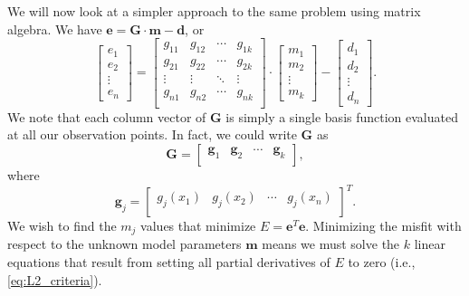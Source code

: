 We will now look at a simpler approach to the same problem using matrix algebra. We have $\mathbf{e = G \cdot m - d}$, or
\begin{equation}
\left [ \begin{array}{c} e_1\\ e_2 \\ \vdots \\ e_n  \end{array} \right ] =
\left [
\begin{array}{cccc}
g_{11} & g_{12} & \cdots & g_{1k} \\	 
g_{21} & g_{22} & \cdots & g_{2k} \\
\vdots & \vdots & \ddots & \vdots\\
g_{n1} & g_{n2} & \cdots & g_{nk} \\
\end{array} \right ]
\cdot
\left [ \begin{array}{c} 
m_1\\ 
m_2\\
 \vdots\\ 
m_k   \end{array}   \right]
-
\left [ \begin{array}{c} d_1\\ d_2 \\ \vdots \\ d_n  \end{array} \right ].
\end{equation}
We note that each column vector of $\mathbf{G}$ is simply a single basis function evaluated at all our
observation points.  In fact, we could write $\mathbf{G}$ as
\begin{equation}
\mathbf{G} = \left [
\begin{array}{cccc}
\mathbf{g}_1 & \mathbf{g}_2 & \cdots & \mathbf{g}_k \\	 
\end{array} \right ],
\label{eq:Aasvectors}
\end{equation}
where
\begin{equation}
\mathbf{g}_j = \left [
\begin{array}{cccc}
g_j(x_1) & g_j(x_2) & \cdots & g_j(x_n) \\	 
\end{array} \right ]^T.
\end{equation}
We wish to find the $m_j$ values that minimize $E = \mathbf{e}^T\mathbf{e}$.
Minimizing the misfit with respect to the unknown model parameters $\mathbf{m}$ means we must solve
the $k$ linear equations that result from setting all partial derivatives of $E$ to zero (i.e., \ref{eq:L2_criteria}).
